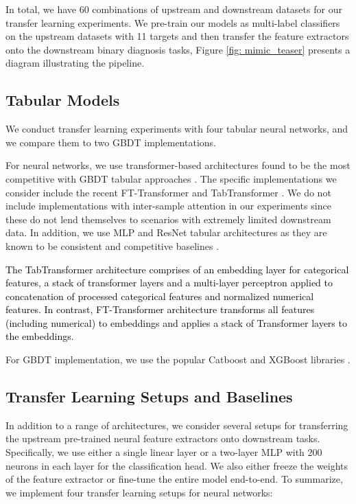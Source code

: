 In total, we have 60 combinations of upstream and downstream datasets for our transfer learning experiments. We pre-train our models as multi-label classifiers on the upstream datasets with 11 targets and then transfer the feature extractors onto the downstream binary diagnosis tasks, Figure \ref{fig: mimic_teaser} presents a diagram illustrating the pipeline.

\subsection{Tabular Models}

We conduct transfer learning experiments with four tabular neural networks, and we compare them to two GBDT implementations. 

For neural networks, we use transformer-based architectures found to be the most competitive with GBDT tabular approaches \citep{gorishniy2021revisiting, huang2020tabtransformer, gorishniy2022embeddings}. The specific implementations we consider include the recent FT-Transformer \citep{gorishniy2021revisiting} and TabTransformer \citep{huang2020tabtransformer}. We do not include implementations with inter-sample attention \citep{somepalli2021saint, kossen2021self} in our experiments since these do not lend themselves to scenarios with extremely limited downstream data. In addition, we use MLP and ResNet tabular architectures as they are known to be consistent and competitive baselines \citep{gorishniy2021revisiting}. 

\textcolor{black}{The TabTransformer architecture comprises of an embedding layer for categorical features, a stack of transformer layers and a multi-layer perceptron applied to concatenation of processed categorical features and normalized numerical features. In contrast, FT-Transformer architecture transforms all features (including numerical) to embeddings and applies a stack of Transformer layers to the embeddings.}

For GBDT implementation, we use the popular Catboost \citep{prokhorenkova2018catboost} and XGBoost libraries \citep{chen2016xgboost}.
\subsection{Transfer Learning Setups and Baselines}

In addition to a range of architectures, we consider several setups for transferring the upstream pre-trained neural feature extractors onto downstream tasks. Specifically, we use either a single linear layer or a two-layer MLP with 200 neurons in each layer for the classification head. We also either freeze the weights of the feature extractor or fine-tune the entire model end-to-end. To summarize, we implement four transfer learning setups for neural networks:

